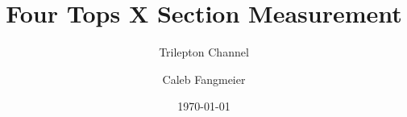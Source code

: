 \documentclass[english,aspectratio=169]{beamer}
\begin{document}
\title[4t X-Section]{Four Tops X Section Measurement}

\subtitle{Trilepton Channel}

\author[C. Fangmeier]{Caleb Fangmeier}


\date{\today}


\begin{frame}[plain]
  \titlepage%
\end{frame}
\end{document}
